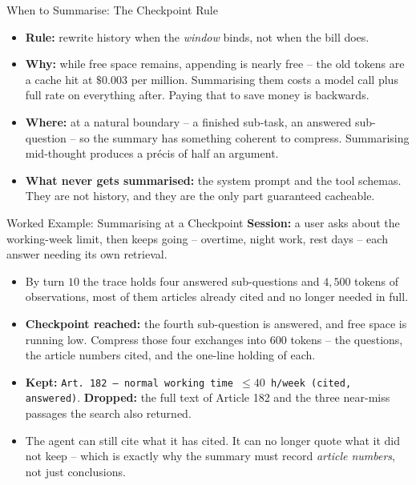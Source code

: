 \begin{frame}{When to Summarise: The Checkpoint Rule}
\begin{itemize}
  \item \textbf{Rule:} rewrite history when the \emph{window} binds, not when the bill does.
  \pause
  \item \textbf{Why:} while free space remains, appending is nearly free -- the old tokens are a cache hit at $\$0.003$ per million. Summarising them costs a model call plus full rate on everything after. Paying that to save money is backwards.
  \pause
  \item \textbf{Where:} at a natural boundary -- a finished sub-task, an answered sub-question -- so the summary has something coherent to compress. Summarising mid-thought produces a pr\'ecis of half an argument.
  \pause
  \item \textbf{What never gets summarised:} the system prompt and the tool schemas. They are not history, and they are the only part guaranteed cacheable.
\end{itemize}
\end{frame}

\begin{frame}{Worked Example: Summarising at a Checkpoint}
\small
\textbf{Session:} a user asks about the working-week limit, then keeps going -- overtime, night work, rest days -- each answer needing its own retrieval.
\smallskip
\pause
\begin{itemize}
  \item By turn $10$ the trace holds four answered sub-questions and $4{,}500$ tokens of observations, most of them articles already cited and no longer needed in full.
  \pause
  \item \textbf{Checkpoint reached:} the fourth sub-question is answered, and free space is running low. Compress those four exchanges into $600$ tokens -- the questions, the article numbers cited, and the one-line holding of each.
  \pause
  \item \textbf{Kept:} \texttt{Art.~182 -- normal working time $\le 40$ h/week (cited, answered)}. \textbf{Dropped:} the full text of Article 182 and the three near-miss passages the search also returned.
  \pause
  \item The agent can still cite what it has cited. It can no longer quote what it did not keep -- which is exactly why the summary must record \emph{article numbers}, not just conclusions.
\end{itemize}
\end{frame}
